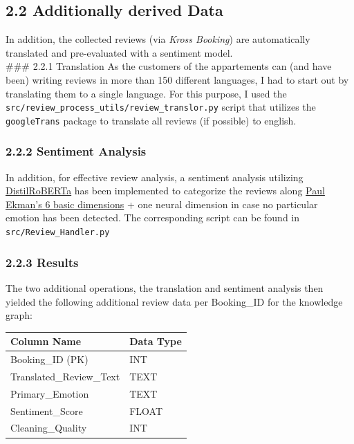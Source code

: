 \documentclass[
]{article}
\begin{document}
\subsection{2.2 Additionally derived
Data}\label{additionally-derived-data}

In addition, the collected reviews (via \emph{Kross Booking}) are
automatically translated and pre-evaluated with a sentiment model.\\
\#\#\# 2.2.1 Translation As the customers of the appartements can (and
have been) writing reviews in more than 150 different languages, I had
to start out by translating them to a single language. For this purpose,
I used the \texttt{src/review\_process\_utils/review\_translor.py}
script that utilizes the \texttt{googleTrans} package to translate all
reviews (if possible) to english.

\subsubsection{2.2.2 Sentiment Analysis}\label{sentiment-analysis}

In addition, for effective review analysis, a sentiment analysis
utilizing
\href{https://huggingface.co/j-hartmann/emotion-english-distilroberta-base}{DistilRoBERTa}
has been implemented to categorize the reviews along
\href{https://www.paulekman.com/wp-content/uploads/2013/07/Basic-Emotions.pdf}{Paul
Ekman's 6 basic dimensions} + one neural dimension in case no particular
emotion has been detected. The corresponding script can be found in
\texttt{src/Review\_Handler.py}

\subsubsection{2.2.3 Results}\label{results}

The two additional operations, the translation and sentiment analysis
then yielded the following additional review data per Booking\_ID for
the knowledge graph:

\begin{longtable}[]{@{}ll@{}}
\toprule\noalign{}
Column Name & Data Type \\
\midrule\noalign{}
\endhead
\bottomrule\noalign{}
\endlastfoot
Booking\_ID (PK) & INT \\
Translated\_Review\_Text & TEXT \\
Primary\_Emotion & TEXT \\
Sentiment\_Score & FLOAT \\
Cleaning\_Quality & INT \\
\end{longtable}
\end{document}
